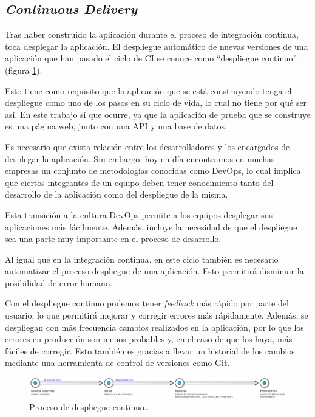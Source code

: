 \subsection*{\textit{Continuous Delivery}}
\label{subsec:CD}

Tras haber construido la aplicación durante el proceso de integración continua, toca desplegar la aplicación. El despliegue automático de nuevas versiones de una aplicación que han pasado el ciclo de CI se conoce como ``despliegue continuo'' (figura \ref{fig:cd}).

Esto tiene como requisito que la aplicación que se está construyendo tenga el despliegue como uno de los pasos en su ciclo de vida, lo cual no tiene por qué ser así. En este trabajo sí que ocurre, ya que la aplicación de prueba que se construye es una página web, junto con una API y una base de datos.

Es necesario que exista relación entre los desarrolladores y los encargados de desplegar la aplicación. Sin embargo, hoy en día encontramos en muchas empresas un conjunto de metodologías conocidas como DevOps\cite{devops}, lo cual implica que ciertos integrantes de un equipo deben tener conocimiento tanto del desarrollo de la aplicación como del despliegue de la misma.

Esta transición a la cultura DevOps permite a los equipos desplegar sus aplicaciones más fácilmente. Además, incluye la necesidad de que el despliegue sea una parte muy importante en el proceso de desarrollo.

Al igual que en la integración continua, en este ciclo también es necesario automatizar el proceso despliegue de una aplicación. Esto permitirá disminuir la posibilidad de error humano.

Con el despliegue continuo podemos tener \textit{feedback} más rápido por parte del usuario, lo que permitirá mejorar y corregir errores más rápidamente. Además, se despliegan con más frecuencia cambios realizados en la aplicación, por lo que los errores en producción son menos probables y, en el caso de que los haya, más fáciles de corregir. Esto también es gracias a llevar un historial de los cambios mediante una herramienta de control de versiones como Git.

\begin{figure}
  \centerline{\includegraphics[width=17cm]{figuras/cd}}
  \caption{Proceso de despliegue continuo.\cite{img:cd}.}
  \label{fig:cd}
\end{figure}


